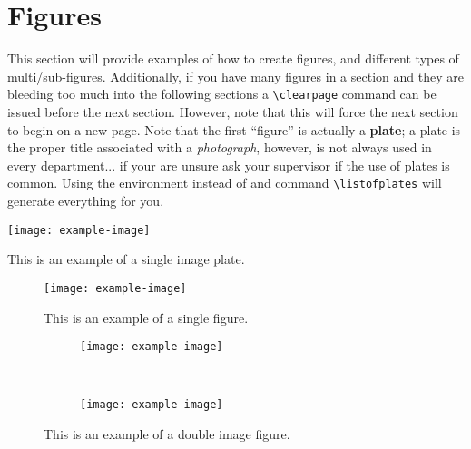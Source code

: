  \section{Figures}
  This section will provide examples of how to create figures, and different types of multi/sub-figures. 
  Additionally, if you have many figures in a section and they are bleeding too much into the following sections a \lstinline|\clearpage| command can be issued before the next section. 
  However, note that this will force the next section to begin on a new page. 
  Note that the first \enquote{figure} is actually a \textbf{plate}; a plate is the proper title associated with a \textit{photograph}, however, is not always used in every department... if your are unsure ask your supervisor if the use of plates is common. Using the environment  instead of  and command \lstinline|\listofplates| will generate everything for you.
  \begin{plate}[H]
    \centering
    \texttt{[image: example-image]}
    \caption{This is an example of a single image plate.}
    \label{plate:singleImage}
  \end{plate}
  
  \begin{figure}[H]
    \centering
    \texttt{[image: example-image]}
    \caption{This is an example of a single figure.}
    \label{fig:singleImage}
  \end{figure}
  \begin{figure}[H]
    \centering
    \begin{subfigure}{0.45\textwidth}
      \texttt{[image: example-image]}
      \caption{} %
      \label{fig:doubleImage:a}
    \end{subfigure}
    ~
    \begin{subfigure}{0.45\textwidth}
      \texttt{[image: example-image]}
      \caption{} %
      \label{fig:doubleImage:b}
    \end{subfigure}
    \caption{This is an example of a double image figure.}
    \label{fig:doubleImage}
  \end{figure}
  
